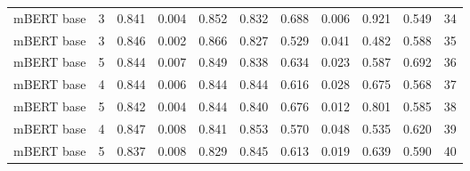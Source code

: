 \begin{tabular}{lrrrrrrrrrr}
        mBERT base &      3 &   0.841 &          0.004 &    0.852 &     0.832 &    0.688 &           0.006 &     0.921 &      0.549 &  34 \\
        mBERT base &      3 &   0.846 &          0.002 &    0.866 &     0.827 &    0.529 &           0.041 &     0.482 &      0.588 &  35 \\
        mBERT base &      5 &   0.844 &          0.007 &    0.849 &     0.838 &    0.634 &           0.023 &     0.587 &      0.692 &  36 \\
        mBERT base &      4 &   0.844 &          0.006 &    0.844 &     0.844 &    0.616 &           0.028 &     0.675 &      0.568 &  37 \\
        mBERT base &      5 &   0.842 &          0.004 &    0.844 &     0.840 &    0.676 &           0.012 &     0.801 &      0.585 &  38 \\
        mBERT base &      4 &   0.847 &          0.008 &    0.841 &     0.853 &    0.570 &           0.048 &     0.535 &      0.620 &  39 \\
        mBERT base &      5 &   0.837 &          0.008 &    0.829 &     0.845 &    0.613 &           0.019 &     0.639 &      0.590 &  40 \\
\bottomrule
\end{tabular}

